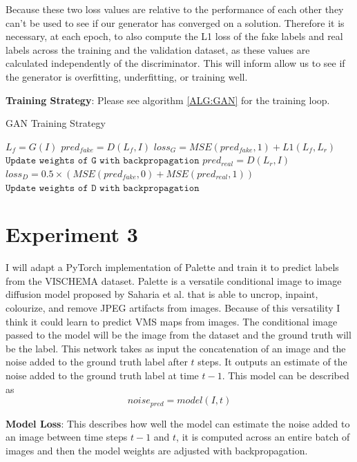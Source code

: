 \documentclass{UoYCSproject}
\begin{document}
Because these two loss values are relative to the performance of each other they can't be used to see if our generator has converged on a solution. Therefore it is necessary, at each epoch, to also compute the L1 loss of the fake labels and real labels across the training and the validation dataset, as these values are calculated independently of the discriminator. This will inform allow us to see if the generator is overfitting, underfitting, or training well. 

\textbf{Training Strategy}: Please see algorithm \ref{ALG:GAN} for the training loop.

\begin{algorithm}
\caption{GAN Training Strategy}\label{ALG:GAN}
\begin{algorithmic}[1]
\State
\State $L_{f} = G(I)$
\State
\State $pred_{fake} = D(L_{f}, I) $
\State $loss_G = MSE( pred_{fake}, 1 ) + L1(L_{f}, L_{r}) $
\State $\texttt{Update weights of G with backpropagation}$
\State
\State $pred_{real} = D(L_{r}, I)$
\State $loss_D = 0.5 \times  ( MSE( pred_{fake}, 0) + MSE( pred_{real}, 1) ) $
\State $\texttt{Update weights of D with backpropagation}$
\State
\EndFor
\EndFor
\end{algorithmic}
\end{algorithm}

\section{Experiment 3}

I will adapt a PyTorch implementation of Palette \cite{JanspiryPalette} and train it to predict labels from the VISCHEMA dataset. Palette is a versatile conditional image to image diffusion model proposed by Saharia et al. \cite{saharia2022palette} that is able to uncrop, inpaint, colourize, and remove JPEG artifacts from images. Because of this versatility I think it could learn to predict VMS maps from images. The conditional image passed to the model will be the image from the dataset and the ground truth will be the label. This network takes as input the concatenation of an image and the noise added to the ground truth label after $t$ steps. It outputs an estimate of the noise added to the ground truth label at time $t-1$.
This model can be described as \[ noise_{pred} = model(I, t) \]

\textbf{Model Loss}: This describes how well the model can estimate the noise added to an image between time steps $t-1$ and $t$, it is computed across an entire batch of images and then the model weights are adjusted with backpropagation.
\end{document}
